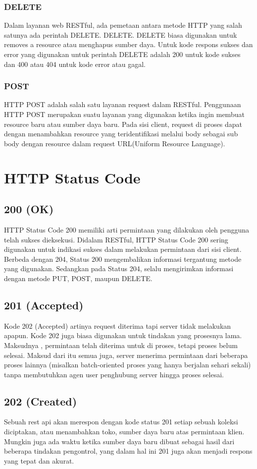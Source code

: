 \documentclass[12pt,a4paper]{article}
\begin{document}
\subsubsection{DELETE}
Dalam layanan web RESTful, ada pemetaan antara metode HTTP  yang salah satunya ada perintah DELETE. DELETE. DELETE biasa digunakan untuk removes a resource atau menghapus sumber daya. Untuk kode respons sukses dan error yang digunakan untuk perintah DELETE adalah 200 untuk kode sukses dan 400 atau 404 untuk kode error atau gagal. 
\subsubsection{POST}
HTTP POST adalah salah satu layanan request dalam RESTful. Penggunaan HTTP POST merupakan suatu layanan yang digunakan ketika ingin membuat resource baru atau sumber daya baru. Pada sisi client, request di proses dapat dengan menambahkan resource yang teridentifikasi melalui body sebagai sub body dengan resource dalam request URL(Uniform Resource Language).

\section{HTTP Status Code}
\subsection{200 (OK)}
HTTP Status Code 200 memiliki arti permintaan yang dilakukan oleh pengguna telah sukses dieksekusi. Didalam RESTful, HTTP Status Code 200 sering digunakan untuk indikasi sukses dalam melakukan permintaan dari sisi client. Berbeda dengan 204, Status 200 mengembalikan informasi tergantung metode yang digunakan.
Sedangkan pada Status 204, selalu mengirimkan informasi dengan metode PUT, POST, maupun DELETE.
\subsection{201 (Accepted)}
Kode 202 (Accepted) artinya request diterima tapi server tidak melakukan apapun. Kode 202 juga biasa digunakan untuk tindakan yang prosesnya lama. Maksudnya , permintaan telah diterima untuk di proses, tetapi proses belum selesai. 
Maksud dari itu semua juga, server menerima permintaan dari beberapa proses lainnya (misalkan batch-oriented proses yang hanya berjalan sehari sekali) tanpa membutuhkan agen user penghubung server hingga proses selesai.
\subsection{202 (Created)}
Sebuah rest api akan merespon dengan kode status 201 setiap sebuah koleksi diciptakan, atau menambahkan toko, sumber daya baru atas permintaan klien. Mungkin juga ada waktu ketika sumber daya baru dibuat sebagai hasil dari beberapa tindakan pengontrol, yang dalam hal ini 201 juga akan menjadi respons yang tepat dan akurat.
\end{document}
